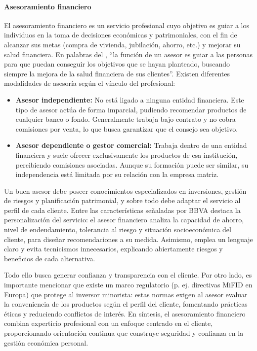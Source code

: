 \paragraph*{Asesoramiento financiero}
El asesoramiento financiero es un servicio profesional cuyo objetivo es guiar a los individuos en la toma de decisiones económicas y patrimoniales, con el fin de alcanzar sus metas (compra de vivienda, jubilación, ahorro, etc.) y mejorar su salud financiera. En palabras del \textcite{BBVA02}, “la función de un asesor es guiar a las personas para que puedan conseguir los objetivos que se hayan planteado, buscando siempre la mejora de la salud financiera de sus clientes”. Existen diferentes modalidades de asesoría según el vínculo del profesional:
\begin{itemize}
	\item \textbf{Asesor independiente:} No está ligado a ninguna entidad financiera. Este tipo de asesor actúa de forma imparcial, pudiendo recomendar productos de cualquier banco o fondo. Generalmente trabaja bajo contrato y no cobra comisiones por venta, lo que busca garantizar que el consejo sea objetivo.
	\item \textbf{Asesor dependiente o gestor comercial:} Trabaja dentro de una entidad financiera y suele ofrecer exclusivamente los productos de esa institución, percibiendo comisiones asociadas. Aunque su formación puede ser similar, su independencia está limitada por su relación con la empresa matriz.
\end{itemize}

Un buen asesor debe poseer conocimientos especializados en inversiones, gestión de riesgos y planificación patrimonial, y sobre todo debe adaptar el servicio al perfil de cada cliente. Entre las características señaladas por BBVA destaca la
personalización del servicio: el asesor financiero analiza la capacidad de ahorro, nivel de endeudamiento, tolerancia al riesgo y situación socioeconómica del cliente, para diseñar recomendaciones a su medida. Asimismo, emplea un lenguaje claro y evita tecnicismos innecesarios, explicando abiertamente riesgos y beneficios de cada alternativa.

Todo ello busca generar confianza y transparencia con el cliente. Por otro lado, es importante mencionar que existe un marco regulatorio (p. ej. directivas MiFID en Europa) que protege al inversor minorista: estas normas exigen al asesor evaluar la conveniencia de los productos según el perfil del cliente, fomentando prácticas éticas y reduciendo conflictos de interés. En síntesis, el asesoramiento financiero combina experticio profesional con un enfoque centrado en el cliente, proporcionando orientación continua que construye seguridad y confianza en la gestión económica personal.

